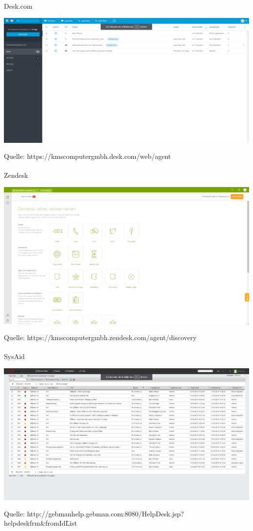 \noindent Desk.com
\begin{flushleft}
\includegraphics[width=1.0\textwidth]{Abbildungen/Deskcom.png}
\end{flushleft}
\noindent Quelle: https://kmscomputergmbh.desk.com/web/agent \\\\

\noindent Zendesk
\begin{flushleft}
\includegraphics[width=1.0\textwidth]{Abbildungen/Zendesk.png}
\end{flushleft}
\noindent Quelle: https://kmscomputergmbh.zendesk.com/agent/discovery\\\\

\noindent SysAid
\begin{flushleft}
\includegraphics[width=1.0\textwidth]{Abbildungen/SysAid.png}
\end{flushleft}
\noindent Quelle: http://gebmanhelp.gebman.com:8080/HelpDesk.jsp?helpdeskfrm\&fromId\=List
\newpage

